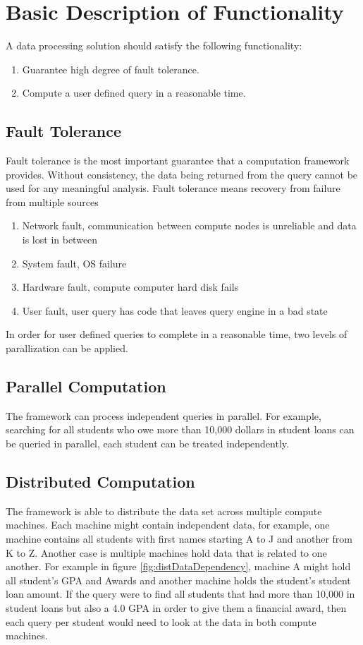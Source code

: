 \documentclass[10pt,twocolumn]{IEEEtran11}
\begin{document}
\section{Basic Description of Functionality}

A data processing solution should satisfy the following functionality:
\begin{enumerate}	
	\item Guarantee high degree of fault tolerance.
	\item Compute a user defined query in a reasonable time.
\end{enumerate}

\subsection{Fault Tolerance}
Fault tolerance is the most important guarantee that a computation framework provides.  Without consistency, the data being returned from the query cannot be used for any meaningful analysis. Fault tolerance means recovery from failure from multiple sources

\begin{enumerate}
	\item Network fault, communication between compute nodes is unreliable and data is lost in between
	\item System fault, OS failure
	\item Hardware fault, compute computer hard disk fails
	\item User fault, user query has code that leaves query engine in a bad state
\end{enumerate}

In order for user defined queries to complete in a reasonable time, two levels of parallization can be applied.

\subsection{Parallel Computation}
The framework can process independent queries in parallel.  For example, searching for all students who owe more than 10,000 dollars in student loans
can be queried in parallel, each student can be treated independently.

\subsection{Distributed Computation}
The framework is able to distribute the data set across multiple compute machines.  Each machine might contain independent data, for example, one machine contains all students with first names starting A to J and another from K to Z.  Another case is multiple machines hold data that is related to one another.  For example in figure \ref{fig:distDataDependency}, machine A might hold all student's GPA and Awards and another machine holds the student's student loan amount.
If the query were to find all students that had more than 10,000 in student loans but also a 4.0 GPA in order to give them a financial award, then each query per student would need to look at the data in both compute machines.
\end{document}
